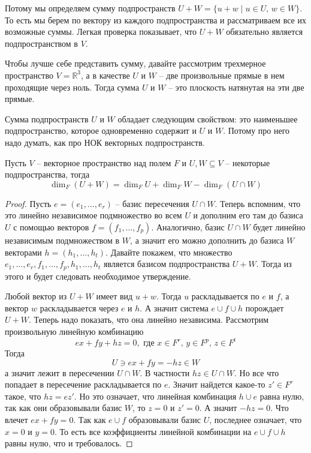 Потому мы определяем сумму подпространств $U + W = \{u + w\mid u\in U,\, w\in W\}$.
То есть мы берем по вектору из каждого подпространства и рассматриваем все их возможные суммы.
Легкая проверка показывает, что $U+W$ обязательно является подпространством в $V$.

Чтобы лучше себе представить сумму, давайте рассмотрим трехмерное пространство $V = \mathbb R^3$, а в качестве $U$ и $W$ -- две произвольные прямые в нем проходящие через ноль.
Тогда сумма $U$ и $W$ -- это плоскость натянутая на эти две прямые.

Сумма подпространств $U$ и $W$ обладает следующим свойством: это наименьшее подпространство, которое одновременно содержит и $U$ и $W$.
Потому про него надо думать, как про НОК векторных подпространств.

\begin{claim}
Пусть $V$ -- векторное пространство над полем $F$ и $U,W\subseteq V$ -- некоторые подпространства, тогда 
\[
\dim_F (U + W) = \dim_F U + \dim_F W - \dim_F (U\cap W)
\]
\end{claim}
\begin{proof}
Пусть $e=(e_1,\ldots,e_r)$ -- базис пересечения $U\cap W$.
Теперь вспомним, что это линейно независимое подмножество во всем $U$ и дополним его там до базиса $U$ с помощью векторов $f=(f_1,\ldots, f_p)$.
Аналогично, базис $U\cap W$ будет линейно независимым подмножеством в $W$, а значит его можно дополнить до базиса $W$ векторами $h=(h_1,\ldots,h_t)$.
Давайте покажем, что множество $e_1,\ldots,e_r, f_1,\ldots,f_p,h_1,\ldots,h_t$ является базисом подпространства $U + W$.
Тогда из этого и будет следовать необходимое утверждение.

Любой вектор из $U+W$ имеет вид $u+w$.
Тогда $u$ раскладывается по $e$ и $f$, а вектор $w$ раскладывается через $e$ и $h$.
А значит система $e\cup f\cup h$ порождает $U + W$.
Теперь надо показать, что она линейно независима.
Рассмотрим произвольную линейную комбинацию
\[
e x + fy + hz = 0, \text{ где }x\in F^r,\, y\in F^p,\, z\in F^t
\]
Тогда
\[
U \ni ex +fy = -hz \in W
\]
а значит лежит в пересечении $U\cap W$.
В частности $hz \in U\cap W$.
Но все что попадает в пересечение раскладывается по $e$.
Значит найдется какое-то $z'\in F^r$ такое, что $hz = ez'$.
Но это означает, что линейная комбинация $h\cup e$ равна нулю, так как они образовывали базис $W$, то $z =0$ и $z' = 0$.
А значит $-hz = 0$.
Что влечет $ex + fy = 0$.
Так как $e \cup f$ образовывали базис $U$, последнее означает, что $x = 0$ и $y = 0$.
То есть все коэффициенты линейной комбинации на $e\cup f\cup h$ равны нулю, что и требовалось.
\end{proof}


